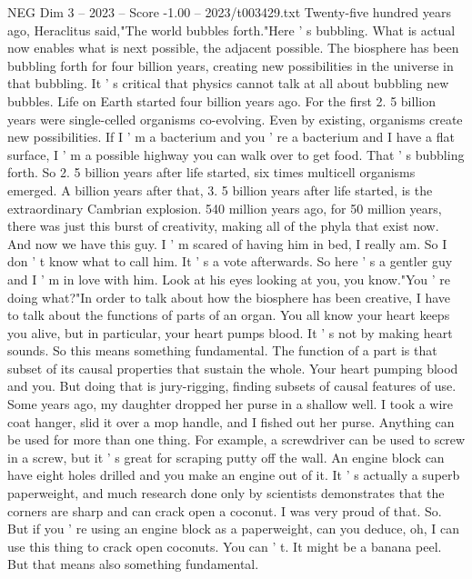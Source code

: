 \begin{textsample}{NEG Dim 3 – 2023 – Score -1.00 – 2023/t003429.txt}  \label{ex:f3_neg_045}
Twenty-five hundred years ago, Heraclitus said,"The world bubbles forth."Here ' s bubbling.
What is actual now enables what is next possible, the adjacent possible.
The biosphere has been bubbling forth for four billion years, creating new possibilities in the universe in that bubbling.
It ' s critical that physics cannot talk at all about bubbling new bubbles.
Life on Earth started four billion years ago.
For the first 2. 5 billion years were single-celled organisms co-evolving.
Even by existing, organisms create new possibilities.
If I ' m a bacterium and you ' re a bacterium and I have a flat surface, I ' m a possible highway you can walk over to get food.
That ' s bubbling forth.
So 2. 5 billion years after life started, six times multicell organisms emerged.
A billion years after that, 3. 5 billion years after life started, is the extraordinary Cambrian explosion. 540 million years ago, for 50 million years, there was just this burst of creativity, making all of the phyla that exist now.
And now we have this guy.
I ' m scared of having him in bed, I really am.
So I don ' t know what to call him.
It ' s a vote afterwards.
So here ' s a gentler guy and I ' m in love with him.
Look at his eyes looking at you, you know."You ' re doing what?"In order to talk about how the biosphere has been creative, I have to talk about the functions of parts of an organ.
You all know your heart keeps you alive, but in particular, your heart pumps blood.
It ' s not by making heart sounds.
So this means something fundamental.
The function of a part is that subset of its causal properties that sustain the whole.
Your heart pumping blood and you.
But doing that is jury-rigging, finding subsets of causal features of use.
Some years ago, my daughter dropped her purse in a shallow well.
I took a wire coat hanger, slid it over a mop handle, and I fished out her purse.
Anything can be used for more than one thing.
For example, a screwdriver can be used to screw in a screw, but it ' s great for scraping putty off the wall.
An engine block can have eight holes drilled and you make an engine out of it.
It ' s actually a superb paperweight, and much research done only by scientists demonstrates that the corners are sharp and can crack open a coconut.
I was very proud of that.
So.
But if you ' re using an engine block as a paperweight, can you deduce, oh, I can use this thing to crack open coconuts.
You can ' t.
It might be a banana peel.
But that means also something fundamental.

\end{textsample}
